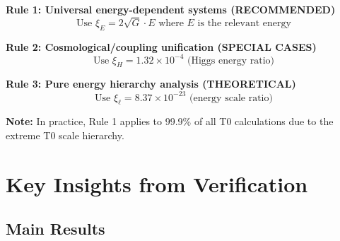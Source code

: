 \documentclass[12pt,a4paper]{article}
\begin{document}
	\begin{tcolorbox}[colback=blue!5!white,colframe=blue!75!black,title=Application Rules for $\xi$ Parameters (Pure Energy)]
		\textbf{Rule 1: Universal energy-dependent systems (RECOMMENDED)}
		\begin{equation}
			\text{Use } \xi_E = 2\sqrt{G} \cdot E \text{ where } E \text{ is the relevant energy}
		\end{equation}
		
		\textbf{Rule 2: Cosmological/coupling unification (SPECIAL CASES)}
		\begin{equation}
			\text{Use } \xi_H = 1.32 \times 10^{-4} \text{ (Higgs energy ratio)}
		\end{equation}
		
		\textbf{Rule 3: Pure energy hierarchy analysis (THEORETICAL)}
		\begin{equation}
			\text{Use } \xi_\ell = 8.37 \times 10^{-23} \text{ (energy scale ratio)}
		\end{equation}
		
		\textbf{Note:} In practice, Rule 1 applies to 99.9\% of all T0 calculations due to the extreme T0 scale hierarchy.
	\end{tcolorbox}
	
	\section{Key Insights from Verification}
	
	\subsection{Main Results}
	
\end{document}
